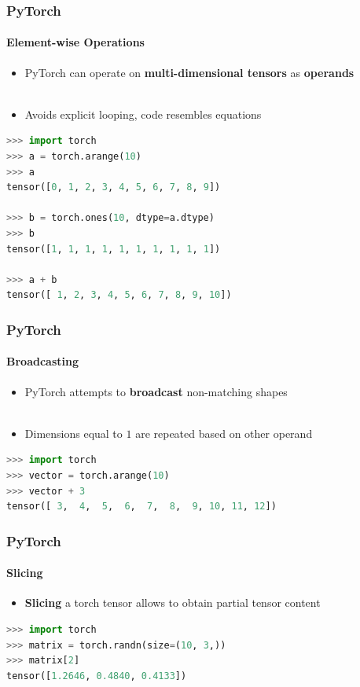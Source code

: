 \documentclass[aspectratio=1610]{beamer}
\begin{document}
\begin{frame}[fragile]
    \frametitle{PyTorch}
    \framesubtitle{Element-wise Operations}
    
    \begin{itemize}
        \item PyTorch can operate on \textbf{multi-dimensional tensors} as \textbf{operands}\\~
        \item Avoids explicit looping, code resembles equations
    \end{itemize}
    \vspace{1em}
    \begin{lstlisting}[language=Python]
>>> import torch
>>> a = torch.arange(10)
>>> a
tensor([0, 1, 2, 3, 4, 5, 6, 7, 8, 9])

>>> b = torch.ones(10, dtype=a.dtype)
>>> b
tensor([1, 1, 1, 1, 1, 1, 1, 1, 1, 1])

>>> a + b
tensor([ 1, 2, 3, 4, 5, 6, 7, 8, 9, 10])
    \end{lstlisting}
\end{frame}

\begin{frame}[fragile]
    \frametitle{PyTorch}
    \framesubtitle{Broadcasting}
    
    \begin{itemize}
        \item PyTorch attempts to \textbf{broadcast} non-matching shapes\\~
        \item Dimensions equal to $1$ are repeated based on other operand
    \end{itemize}
    \vspace{1em}
    \begin{lstlisting}[language=Python]
>>> import torch
>>> vector = torch.arange(10)
>>> vector + 3
tensor([ 3,  4,  5,  6,  7,  8,  9, 10, 11, 12])
    \end{lstlisting}
\end{frame}

\begin{frame}[fragile]
    \frametitle{PyTorch}
    \framesubtitle{Slicing}
    
    \begin{itemize}
        \item \textbf{Slicing} a torch tensor allows to obtain partial tensor content
    \end{itemize}
    \vspace{1em}
    \begin{lstlisting}[language=Python]
>>> import torch
>>> matrix = torch.randn(size=(10, 3,))
>>> matrix[2]
tensor([1.2646, 0.4840, 0.4133])
    \end{lstlisting}
\end{frame}
\end{document}
